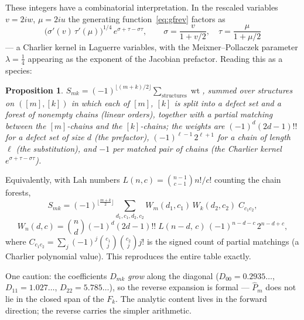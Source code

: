 \documentclass[11pt,a4paper]{article}
\newtheorem{proposition}{Proposition}[section]
\begin{document}
These integers have a combinatorial interpretation. In the rescaled
variables $v = 2iw$, $\mu = 2iu$ the generating
function~\eqref{eq:gfrev} factors as
\[
  \bigl(\sigma'(v)\,\tau'(\mu)\bigr)^{1/4}\, e^{\sigma+\tau-\sigma\tau},
  \qquad
  \sigma = \frac{v}{1+v/2}, \quad \tau = \frac{\mu}{1+\mu/2}
\]
--- a Charlier kernel in Laguerre variables, with the
Meixner--Pollaczek parameter $\lambda = \tfrac14$ appearing as the
exponent of the Jacobian prefactor. Reading this as a species:

\begin{proposition}
$S_{mk} = (-1)^{\lfloor (m+k)/2 \rfloor} \sum_{\text{structures}}
\operatorname{wt}$, summed over structures on $([m], [k])$ in which
each of $[m]$, $[k]$ is split into a \emph{defect set} and a forest of
nonempty \emph{chains} (linear orders), together with a partial
matching between the $[m]$-chains and the $[k]$-chains; the weights
are $(-1)^d (2d-1)!!$ for a defect set of size $d$ (the prefactor),
$(-1)^{\ell-1}\, 2^{\ell+1}$ for a chain of length $\ell$ (the
substitution), and $-1$ per matched pair of chains (the Charlier
kernel $e^{\sigma+\tau-\sigma\tau}$).
\end{proposition}

Equivalently, with Lah numbers
$L(n,c) = \binom{n-1}{c-1} n!/c!$ counting the chain forests,
\[
  S_{mk} = (-1)^{\lfloor \frac{m+k}{2} \rfloor}
  \sum_{d_1, c_1, d_2, c_2}
  W_m(d_1, c_1)\, W_k(d_2, c_2)\; C_{c_1 c_2},
\]
\[
  W_n(d, c) = \binom{n}{d} (-1)^{d} (2d-1)!!\;
  L(n{-}d,\, c)\, (-1)^{n-d-c}\, 2^{n-d+c},
\]
where $C_{c_1 c_2} = \sum_j (-1)^j \binom{c_1}{j}\binom{c_2}{j} j!$
is the signed count of partial matchings (a Charlier polynomial
value). This reproduces the entire table exactly.

One caution: the coefficients $D_{mk}$ \emph{grow} along the diagonal
($D_{00} = 0.2935\ldots$, $D_{11} = 1.027\ldots$,
$D_{22} = 5.785\ldots$), so the reverse expansion is formal —
$\widehat{P}_m$ does not lie in the closed span of the $F_k$. The
analytic content lives in the forward direction; the reverse carries
the simpler arithmetic.
\end{document}
